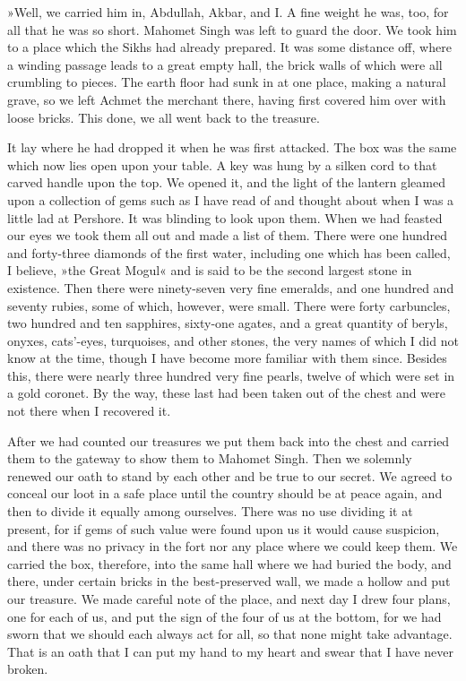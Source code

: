 »Well, we carried him in, Abdullah, Akbar, and I. A fine weight he was, too, for all that he was so short. Mahomet Singh was left to guard the door. We took him to a place which the Sikhs had already prepared. It was some distance off, where a winding passage leads to a great empty hall, the brick walls of which were all crumbling to pieces. The earth floor had sunk in at one place, making a natural grave, so we left Achmet the merchant there, having first covered him over with loose bricks. This done, we all went back to the treasure.

It lay where he had dropped it when he was first attacked. The box was the same which now lies open upon your table. A key was hung by a silken cord to that carved handle upon the top. We opened it, and the light of the lantern gleamed upon a collection of gems such as I have read of and thought about when I was a little lad at Pershore. It was blinding to look upon them. When we had feasted our eyes we took them all out and made a list of them. There were one hundred and forty-three diamonds of the first water, including one which has been called, I believe, »the Great Mogul« and is said to be the second largest stone in existence. Then there were ninety-seven very fine emeralds, and one hundred and seventy rubies, some of which, however, were small. There were forty carbuncles, two hundred and ten sapphires, sixty-one agates, and a great quantity of beryls, onyxes, cats'-eyes, turquoises, and other stones, the very names of which I did not know at the time, though I have become more familiar with them since. Besides this, there were nearly three hundred very fine pearls, twelve of which were set in a gold coronet. By the way, these last had been taken out of the chest and were not there when I recovered it.

After we had counted our treasures we put them back into the chest and carried them to the gateway to show them to Mahomet Singh. Then we solemnly renewed our oath to stand by each other and be true to our secret. We agreed to conceal our loot in a safe place until the country should be at peace again, and then to divide it equally among ourselves. There was no use dividing it at present, for if gems of such value were found upon us it would cause suspicion, and there was no privacy in the fort nor any place where we could keep them. We carried the box, therefore, into the same hall where we had buried the body, and there, under certain bricks in the best-preserved wall, we made a hollow and put our treasure. We made careful note of the place, and next day I drew four plans, one for each of us, and put the sign of the four of us at the bottom, for we had sworn that we should each always act for all, so that none might take advantage. That is an oath that I can put my hand to my heart and swear that I have never broken.

